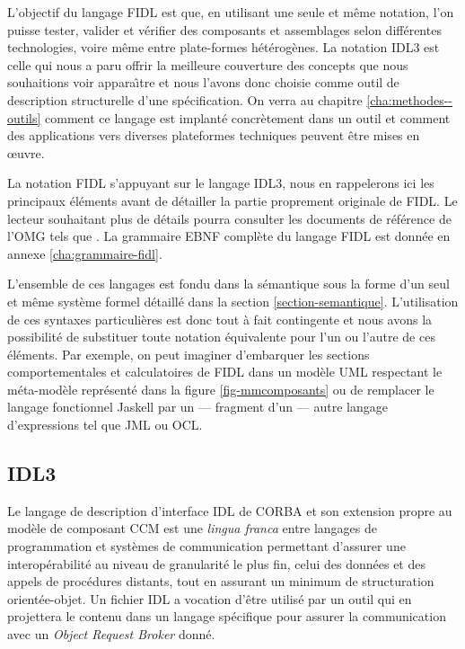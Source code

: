 L'objectif du langage \textsf{FIDL} est que, en utilisant une seule et m\^eme
notation, l'on puisse tester, valider et v\'erifier des composants et assemblages
selon diff\'erentes technologies, voire m\^eme entre plate-formes
h\'et\'erog\`enes. La notation \textsf{IDL3} est celle qui nous a paru
offrir la meilleure couverture des concepts que nous souhaitions voir
appara\^{\i}tre et nous l'avons donc choisie comme outil de  description
structurelle d'une sp\'ecification. On verra au chapitre
\ref{cha:methodes--outils} comment ce langage est implant\'e concr\`etement
dans un outil et comment des applications vers diverses plateformes
techniques peuvent \^etre mises en \oe uvre.



La notation \textsf{FIDL} s'appuyant sur le langage \textsf{IDL3},
nous en rappelerons ici les principaux \'el\'ements avant de
d\'etailler la  
partie proprement originale de \textsf{FIDL}. Le lecteur souhaitant plus de
d\'etails pourra consulter les documents de r\'ef\'erence de l'\textsf{OMG}
tels que \cite{ccmspec,corbaspec}. La grammaire EBNF compl\`ete du
langage \textsf{FIDL} est donn\'ee en annexe
\ref{cha:grammaire-fidl}.

L'ensemble de ces langages est fondu dans la s\'emantique sous la
forme d'un seul et m\^eme syst\`eme formel  d\'etaill\'e dans la
section \ref{section-semantique}. L'utilisation de ces syntaxes
particuli\`eres est donc tout \`a fait contingente et nous avons la
possibilit\'e de substituer toute notation \'equivalente pour l'un
ou l'autre de ces \'el\'ements. Par exemple, on peut imaginer
d'embarquer les sections comportementales et calculatoires de \textsf{FIDL}
dans un mod\`ele \textsf{UML} respectant le m\'eta-mod\`ele
repr\'esent\'e dans la figure \ref{fig-mmcomposants} ou de remplacer
le langage fonctionnel \textsf{Jaskell} par un --- fragment d'un --- autre langage
d'expressions tel que \textsf{JML}\cite{jmlnotation} ou
\textsf{OCL}\cite{ocl20spec}. 

\subsection{\textsf{IDL3}}

Le langage de description d'interface \textsf{IDL} de \textsf{CORBA} et son extension propre au
mod\`ele de composant \textsf{CCM} est une \emph{lingua franca} entre langages
de programmation et syst\`emes de communication permettant d'assurer une
interop\'erabilit\'e au niveau de granularit\'e le plus fin, celui des
donn\'ees et des appels de proc\'edures distants, tout en assurant un
minimum de structuration orient\'ee-objet. Un fichier IDL a vocation
d'\^etre utilis\'e par un outil qui en projettera le contenu dans un
langage sp\'ecifique pour assurer la communication avec un \emph{Object
  Request Broker} donn\'e.

